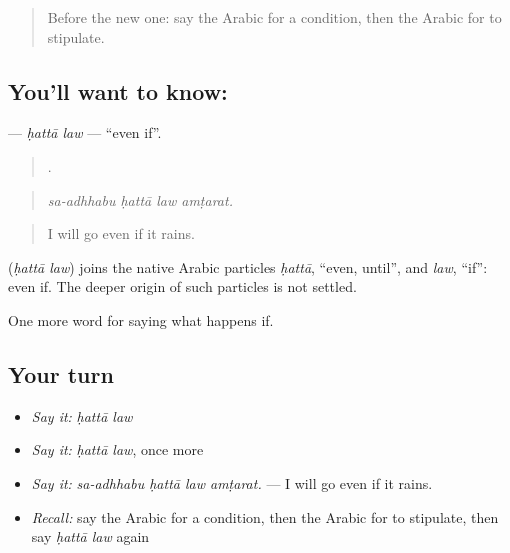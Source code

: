 \label{lesson:AR-C404-hatta-law}



\begin{quote}
Before the new one: say the Arabic for a condition, then the Arabic for to stipulate.
\end{quote}

\subsection*{You'll want to know:  }
\textbf{ } — \emph{ḥattā law} — \textquotedblleft{}even if\textquotedblright{}.

\begin{quote}
   .
\end{quote}

\begin{quote}
\emph{sa-adhhabu ḥattā law amṭarat.}
\end{quote}

\begin{quote}
I will go even if it rains.
\end{quote}

\begin{cousinweb}
\textbf{ } (\emph{ḥattā law}) joins the native Arabic particles \emph{ḥattā}, \textquotedblleft{}even, until\textquotedblright{}, and \emph{law}, \textquotedblleft{}if\textquotedblright{}: even if. The deeper origin of such particles is not settled.
\end{cousinweb}

\begin{grammarlens}[title={What you've built}]
One more word for saying what happens if.
\end{grammarlens}

\subsection*{Your turn}
\begin{itemize}
\raggedright
  \item \emph{Say it:} \emph{ḥattā law}
  \item \emph{Say it:} \emph{ḥattā law}, once more
  \item \emph{Say it:} \emph{sa-adhhabu ḥattā law amṭarat.} — I will go even if it rains.
  \item \emph{Recall:} say the Arabic for a condition, then the Arabic for to stipulate, then say \emph{ḥattā law} again
\end{itemize}

